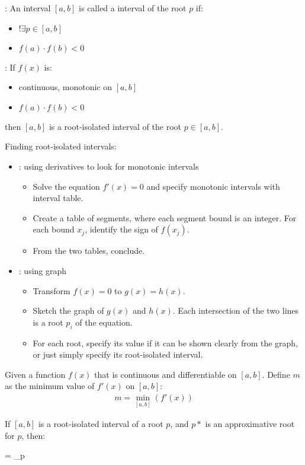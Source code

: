     \par {}: An interval $[a, b]$ is called a 
      interval of the root $p$ if:
    \begin{itemize}
      \item $!\exists p \in [a, b]$
      \item $f(a) \cdot f(b) < 0$
    \end{itemize}
    \par {}: If $f(x)$ is:
      \begin{itemize}
        \item continuous, monotonic on $[a, b]$
        \item $f(a) \cdot f(b) < 0$
      \end{itemize}
      then $[a, b]$ is a root-isolated interval of the root $p \in [a, b]$.
    \par Finding root-isolated intervals:
    \begin{itemize}
      \item {}: using derivatives to look for monotonic intervals
        \begin{itemize}
          \item Solve the equation $f'(x) = 0$ and specify monotonic intervals
            with interval table.
          \item Create a table of segments, where each segment bound is an
            integer. For each bound $x_{j}$, identify the sign of $f(x_{j})$.
          \item From the two tables, conclude.
        \end{itemize}
      \item {}: using graph
        \begin{itemize}
          \item Transform $f(x) = 0$ to $g(x) = h(x)$.
          \item Sketch the graph of $g(x)$ and $h(x)$. Each intersection
            of the two lines is a root $p_{i}$ of the equation.
          \item For each root, specify its value if it can be shown clearly from
            the graph, or just simply specify its root-isolated interval.
        \end{itemize}
    \end{itemize}

    \par Given a function $f(x)$ that is continuous and differentiable on $[a, b]$.
      Define $m$ as the minimum value of $f'(x)$ on $[a, b]$:
      \begin{align*}
        m = \underset{[a, b]}{\min}(f'(x))
      \end{align*}
    \par If $[a, b]$ is a root-isolated interval of a root $p$, and $p*$ is
      an approximative root for $p$, then:
    \begin{eqbox}
       \leq {} = \Delta_{p}
    \end{eqbox}


